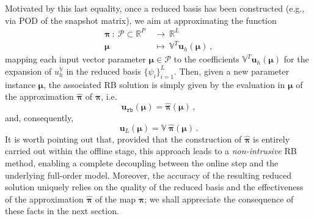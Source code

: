 \documentclass[12pt, a4paper, twoside, openright, notitlepage]{report}
\numberwithin{equation}{chapter}
\theoremstyle{theorem}
\theoremstyle{definition}
\theoremstyle{remark}
\theoremstyle{proposition}
\numberwithin{figure}{chapter}
\newcommand{\bg}[1]{\boldsymbol{#1}}
\begin{document}
		\noindent Motivated by this last equality, once a reduced basis has been constructed (e.g., via POD of the snapshot matrix), we aim at approximating the function
		\begin{equation}
			\label{eq:map-to-approximate}
			\begin{aligned}
				\bg{\pi} ~ : ~ \mathcal{P} \subset \mathbb{R}^P ~ & \rightarrow ~ \mathbb{R}^L \\
				\bg{\mu} ~ & \mapsto ~ \mathbb{V}^T \mathbf{u}_h(\bg{\mu}) \, ,
			\end{aligned}
		\end{equation}
		mapping each input vector parameter $\bg{\mu} \in \mathcal{P}$ to the coefficients $\mathbb{V}^T \mathbf{u}_h(\bg{\mu})$ for the expansion of $u^{\mathbb{V}}_h$ in the reduced basis $\big\lbrace \psi_i \big\rbrace_{i = 1}^L$. Then, given a new parameter instance $\bg{\mu}$, the associated RB solution is simply given by the evaluation in $\bg{\mu}$ of the approximation $\hat{\bg{\pi}}$ of $\bg{\pi}$, i.e.
		\begin{equation*}
			\mathbf{u}_{\texttt{rb}}(\bg{\mu}) = \hat{\bg{\pi}}(\bg{\mu}) \, ,
		\end{equation*}
		and, consequently,
		\begin{equation*}
			\mathbf{u}_L(\bg{\mu}) = \mathbb{V} ~ \hat{\bg{\pi}}(\bg{\mu}) \, .
		\end{equation*}
		It is worth pointing out that, provided that the construction of $\hat{\bg{\pi}}$ is entirely carried out within the offline stage, this approach leads to a \emph{non-intrusive} RB method, enabling a complete decoupling between the online step and the underlying full-order model. Moreover, the accuracy of the resulting reduced solution uniquely relies on the quality of the reduced basis and the effectiveness of the approximation $\hat{\bg{\pi}}$ of the map $\bg{\pi}$; we shall appreciate the consequence of these facts in the next section.
		
\end{document}
